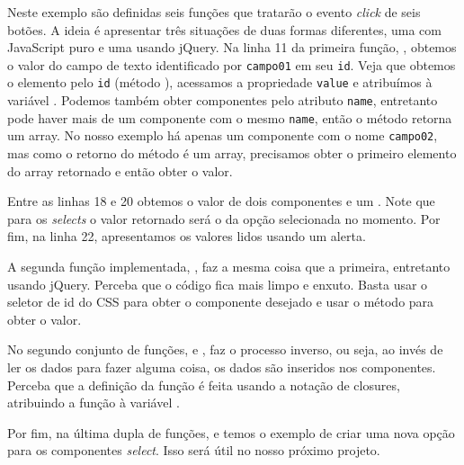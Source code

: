 
Neste exemplo são definidas seis funções que tratarão o evento \textit{click} de seis botões. A ideia é apresentar três situações de duas formas diferentes, uma com JavaScript puro e uma usando jQuery. Na linha 11 da primeira função, , obtemos o valor do campo de texto identificado por \texttt{campo01} em seu \texttt{id}. Veja que obtemos o elemento pelo \texttt{id} (método ), acessamos a propriedade \texttt{value} e atribuímos à variável . Podemos também obter componentes pelo atributo \texttt{name}, entretanto pode haver mais de um componente com o mesmo \texttt{name}, então o método  retorna um array. No nosso exemplo há apenas um componente com o nome \texttt{campo02}, mas como o retorno do método  é um array, precisamos obter o primeiro elemento do array retornado e então obter o valor.

Entre as linhas 18 e 20 obtemos o valor de dois componentes  e um . Note que para os \textit{selects} o valor retornado será o da opção selecionada no momento. Por fim, na linha 22, apresentamos os valores lidos usando um alerta.

A segunda função implementada, , faz a mesma coisa que a primeira, entretanto usando jQuery. Perceba que o código fica mais limpo e enxuto. Basta usar o seletor de id do CSS para obter o componente desejado e usar o método  para obter o valor.

No segundo conjunto de funções,  e \newline%
, faz o processo inverso, ou seja, ao invés de ler os dados para fazer alguma coisa, os dados são inseridos nos componentes. Perceba que a definição da função  é feita usando a notação de closures, atribuindo a função à variável .

Por fim, na última dupla de funções,  e \newline%
 temos o exemplo de criar uma nova opção para os componentes \textit{select}. Isso será útil no nosso próximo projeto.



